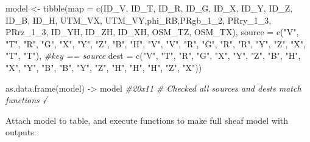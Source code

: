 \documentclass[
]{article}
\newenvironment{Shaded}{\begin{snugshade}}{\end{snugshade}}
\newcommand{\AttributeTok}[1]{\textcolor[rgb]{0.77,0.63,0.00}{#1}}
\newcommand{\CommentTok}[1]{\textcolor[rgb]{0.56,0.35,0.01}{\textit{#1}}}
\newcommand{\FunctionTok}[1]{\textcolor[rgb]{0.00,0.00,0.00}{#1}}
\newcommand{\NormalTok}[1]{#1}
\newcommand{\OtherTok}[1]{\textcolor[rgb]{0.56,0.35,0.01}{#1}}
\newcommand{\StringTok}[1]{\textcolor[rgb]{0.31,0.60,0.02}{#1}}
\begin{document}
\begin{Shaded}
\begin{Highlighting}[]
\NormalTok{model }\OtherTok{\textless{}{-}} \FunctionTok{tibble}\NormalTok{(}\AttributeTok{map =} \FunctionTok{c}\NormalTok{(ID\_V, ID\_T, ID\_R, ID\_G, ID\_X, ID\_Y, ID\_Z, ID\_B, ID\_H, UTM\_VX, UTM\_VY,phi\_RB,PRgb\_1\_2, PRry\_1\_3, PRrz\_1\_3, ID\_YH, ID\_ZH, ID\_XH, OSM\_TZ, OSM\_TX),}
                    \AttributeTok{source =} \FunctionTok{c}\NormalTok{(}\StringTok{"V"}\NormalTok{, }\StringTok{"T"}\NormalTok{, }\StringTok{"R"}\NormalTok{, }\StringTok{"G"}\NormalTok{, }\StringTok{"X"}\NormalTok{, }\StringTok{"Y"}\NormalTok{, }\StringTok{"Z"}\NormalTok{, }\StringTok{"B"}\NormalTok{, }\StringTok{"H"}\NormalTok{, }\StringTok{"V"}\NormalTok{, }\StringTok{"V"}\NormalTok{, }\StringTok{"R"}\NormalTok{, }\StringTok{"G"}\NormalTok{, }\StringTok{"R"}\NormalTok{, }\StringTok{"R"}\NormalTok{, }\StringTok{"Y"}\NormalTok{, }\StringTok{"Z"}\NormalTok{, }\StringTok{"X"}\NormalTok{, }\StringTok{"T"}\NormalTok{, }\StringTok{"T"}\NormalTok{), }\CommentTok{\#key == source}
                    \AttributeTok{dest =}   \FunctionTok{c}\NormalTok{(}\StringTok{"V"}\NormalTok{, }\StringTok{"T"}\NormalTok{, }\StringTok{"R"}\NormalTok{, }\StringTok{"G"}\NormalTok{, }\StringTok{"X"}\NormalTok{, }\StringTok{"Y"}\NormalTok{, }\StringTok{"Z"}\NormalTok{, }\StringTok{"B"}\NormalTok{, }\StringTok{"H"}\NormalTok{, }\StringTok{"X"}\NormalTok{, }\StringTok{"Y"}\NormalTok{, }\StringTok{"B"}\NormalTok{, }\StringTok{"B"}\NormalTok{, }\StringTok{"Y"}\NormalTok{, }\StringTok{"Z"}\NormalTok{, }\StringTok{"H"}\NormalTok{, }\StringTok{"H"}\NormalTok{, }\StringTok{"H"}\NormalTok{, }\StringTok{"Z"}\NormalTok{, }\StringTok{"X"}\NormalTok{))}

\FunctionTok{as.data.frame}\NormalTok{(model) }\OtherTok{{-}\textgreater{}}\NormalTok{ model }\CommentTok{\#20x11}
\CommentTok{\# Checked all sources and dests match functions √}
\end{Highlighting}
\end{Shaded}

Attach model to table, and execute functions to make full sheaf model
with outputs:
\end{document}
